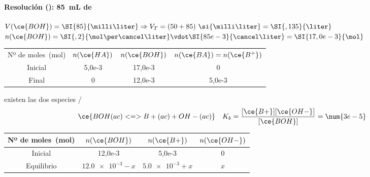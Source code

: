 \begin{frame}
	\frametitle{\ejerciciocmd}
	\framesubtitle{Resolución (): \SI{85}{\milli\liter} de }
	\quad$V(\ce{BOH})=\SI{85}{\milli\liter} \Rightarrow V_T=(50+85)~\si{\milli\liter}=\SI{,135}{\liter}$
	\quad$n(\ce{BOH})=\SI{,2}{\mol\per\cancel\liter}\vdot\SI{85e-3}{\cancel\liter}=\SI{17,0e-3}{\mol}$
	\begin{center}
		\begin{tabular}{cSSS}
			\toprule
				Nº de moles~(\si{\mol})	& {$n(\ce{HA})$}	& {$n(\ce{BOH})$}			& {$n(\ce{BA})=n(\ce{B^+})$}	\\
			Inicial					& 5,0e-3				& 17,0e-3					& 0								\\
			Final					& 0						& 12,0e-3					& 5,0e-3						\\
			\bottomrule
		\end{tabular}
	\end{center}
	\quad existen las dos especies /
	$$
		\ce{BOH(ac) <=> B+(ac) + OH-(ac)}\quad K_b=\frac{[\ce{B+}][\ce{OH-}]}{[\ce{BOH}]}=\num{3e-5}
	$$
	\begin{center}
		\begin{tabular}{cSSS}
			\toprule
				Nº de moles~(\si{\mol})	& {$n(\ce{BOH})$}		& {$n(\ce{B+})$}		& {$n(\ce{OH-})$}	\\
			\midrule
				Inicial					& 12,0e-3				& 5,0e-3				& 0					\\
				Equilibrio				& {$\num{12,0e-3}-x$}	& {$\num{5,0e-3}+x$}	& {$x$}				\\
			\bottomrule
		\end{tabular}
	\end{center}
\end{frame}

